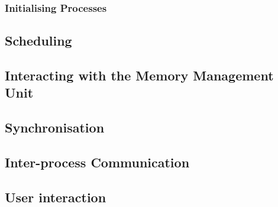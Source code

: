     \subsubsection{Initialising Processes}
\subsection{Scheduling}
\subsection{Interacting with the Memory Management Unit}
\subsection{Synchronisation}
\subsection{Inter-process Communication}
\subsection{User interaction}
